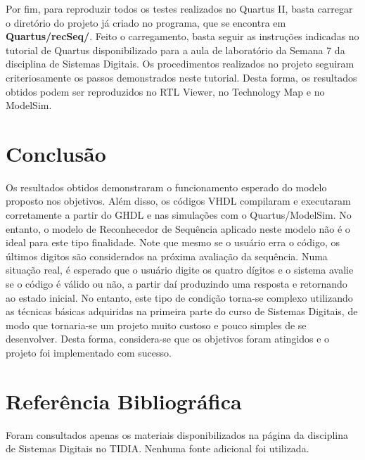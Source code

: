 \documentclass[12pt,a4paper]{article}
\begin{document}
Por fim, para reproduzir todos os testes realizados no Quartus II, basta carregar o diretório do projeto já criado no programa, que se encontra em \textbf{Quartus/recSeq/}. Feito o carregamento, basta seguir as instruções indicadas no tutorial de Quartus disponibilizado para a aula de laboratório da Semana 7 da disciplina de Sistemas Digitais. Os procedimentos realizados no projeto seguiram criteriosamente os passos demonstrados neste tutorial. Desta forma, os resultados obtidos podem ser reproduzidos no RTL Viewer, no Technology Map e no ModelSim.

\section{Conclusão}
Os resultados obtidos demonstraram o funcionamento esperado do modelo proposto nos objetivos. Além disso, os códigos VHDL compilaram e executaram corretamente a partir do GHDL e nas simulações com o Quartus/ModelSim. No entanto, o modelo de Reconhecedor de Sequência aplicado neste modelo não é o ideal para este tipo finalidade. Note que mesmo se o usuário erra o código, os últimos digitos são considerados na próxima avaliação da sequência. Numa situação real, é esperado que o usuário digite os quatro dígitos e o sistema avalie se o código é válido ou não, a partir daí produzindo uma resposta e retornando ao estado inicial. No entanto, este tipo de condição torna-se complexo utilizando as técnicas básicas adquiridas na primeira parte do curso de Sistemas Digitais, de modo que tornaria-se um projeto muito custoso e pouco simples de se desenvolver. Desta forma, considera-se que os objetivos foram atingidos e o projeto foi implementado com sucesso.

\section{Referência Bibliográfica}
Foram consultados apenas os materiais disponibilizados na página da disciplina de Sistemas Digitais no TIDIA. Nenhuma fonte adicional foi utilizada. 
\end{document}
